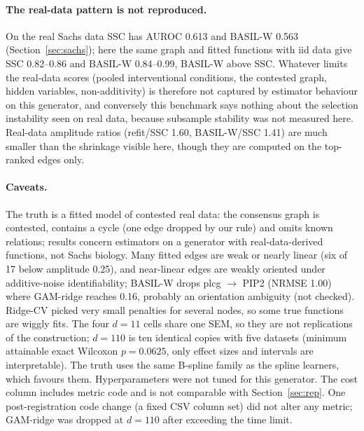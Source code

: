 \paragraph{The real-data pattern is not reproduced.} On the real Sachs data SSC has AUROC 0.613 and BASIL-W 0.563 (Section~\ref{sec:sachs}); here the same graph and fitted functions with iid data give SSC 0.82--0.86 and BASIL-W 0.84--0.99, BASIL-W above SSC. Whatever limits the real-data scores (pooled interventional conditions, the contested graph, hidden variables, non-additivity) is therefore not captured by estimator behaviour on this generator, and conversely this benchmark says nothing about the selection instability seen on real data, because subsample stability was not measured here. Real-data amplitude ratios (refit/SSC 1.60, BASIL-W/SSC 1.41) are much smaller than the shrinkage visible here, though they are computed on the top-ranked edges only.

\paragraph{Caveats.} The truth is a fitted model of contested real data: the consensus graph is contested, contains a cycle (one edge dropped by our rule) and omits known relations; results concern estimators on a generator with real-data-derived functions, not Sachs biology. Many fitted edges are weak or nearly linear (six of 17 below amplitude 0.25), and near-linear edges are weakly oriented under additive-noise identifiability; BASIL-W drops plcg $\to$ PIP2 (NRMSE 1.00) where GAM-ridge reaches 0.16, probably an orientation ambiguity (not checked). Ridge-CV picked very small penalties for several nodes, so some true functions are wiggly fits. The four $d=11$ cells share one SEM, so they are not replications of the construction; $d=110$ is ten identical copies with five datasets (minimum attainable exact Wilcoxon $p=0.0625$, only effect sizes and intervals are interpretable). The truth uses the same B-spline family as the spline learners, which favours them. Hyperparameters were not tuned for this generator. The cost column includes metric code and is not comparable with Section~\ref{sec:rep}. One post-registration code change (a fixed CSV column set) did not alter any metric; GAM-ridge was dropped at $d=110$ after exceeding the time limit.
